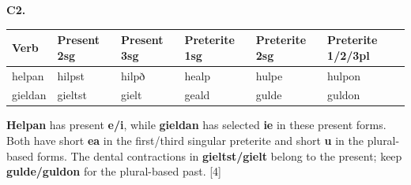 \par\begin{minipage}{\linewidth}\raggedright
\textbf{C2.}

\par\begingroup
\fontsize{10.5}{13.2}\selectfont
\setlength{\LTleft}{0pt}\setlength{\LTright}{\fill}
\noindent
\begin{tabular}{@{}>{\raggedright\arraybackslash}p{17.12mm}>{\raggedright\arraybackslash}p{17.12mm}>{\raggedright\arraybackslash}p{17.12mm}>{\raggedright\arraybackslash}p{18.49mm}>{\raggedright\arraybackslash}p{18.49mm}>{\raggedright\arraybackslash}p{21.58mm}@{}}
\toprule
\textbf{Verb} & \textbf{Present 2sg} & \textbf{Present 3sg} & \textbf{Preterite 1sg} & \textbf{Preterite 2sg} & \textbf{Preterite 1/\allowbreak{}2/\allowbreak{}3pl} \\
\midrule
helpan & hilpst & hilpð & healp & hulpe & hulpon \\
gieldan & gieltst & gielt & geald & gulde & guldon \\
\bottomrule
\end{tabular}
\par\endgroup

\textbf{Helpan} has present \textbf{e/\allowbreak{}i}, while \textbf{gieldan} has selected \textbf{ie} in these present forms. Both have short \textbf{ea} in the first/\allowbreak{}third singular preterite and short \textbf{u} in the plural-based forms. The dental contractions in \textbf{gieltst/\allowbreak{}gielt} belong to the present; keep \textbf{gulde/\allowbreak{}guldon} for the plural-based past. [4]

\end{minipage}\par\addvspace{4pt}

